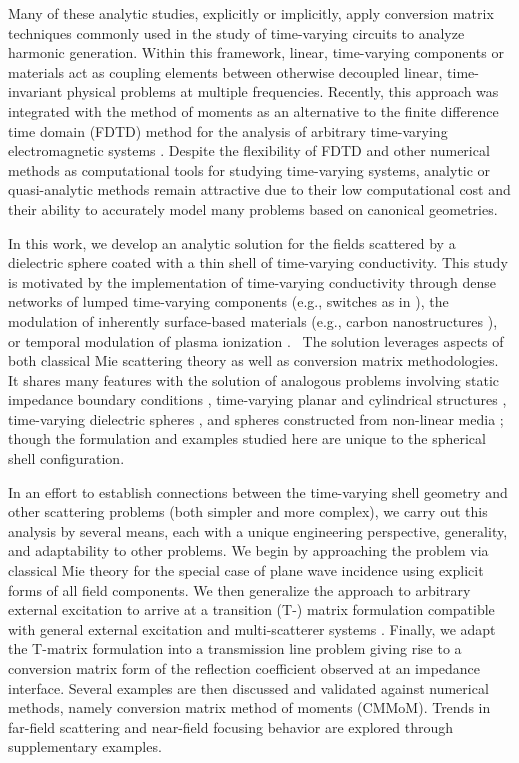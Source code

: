 \documentclass[article]{IEEEtran}
\begin{document}
Many of these analytic studies, explicitly or implicitly, apply conversion matrix techniques \cite{maas2003nonlinear} commonly used in the study of time-varying circuits to analyze harmonic generation. Within this framework, linear, time-varying components or materials act as coupling elements between otherwise decoupled linear, time-invariant physical problems at multiple frequencies.  Recently, this approach was integrated with the method of moments as an alternative to the finite difference time domain (FDTD) method for the analysis of arbitrary time-varying electromagnetic systems \cite{palmer2019investigation,bass2021conversion}.  Despite the flexibility of FDTD and other numerical methods as computational tools for studying time-varying systems, analytic or quasi-analytic methods remain attractive due to their low computational cost and their ability to accurately model many problems based on canonical geometries.

In this work, we develop an analytic solution for the fields scattered by a dielectric sphere coated with a thin shell of time-varying conductivity.  This study is motivated by the implementation of time-varying conductivity through dense networks of lumped time-varying components (e.g., switches as in \cite{wu2019serrodyne,taravati2020space}), the modulation of inherently surface-based materials (e.g., carbon nanostructures \cite{salary2018electrically}),  or temporal modulation of plasma ionization \cite{singletary2021}.~ The solution leverages aspects of both classical Mie scattering theory \cite{jin2011theory} as well as conversion matrix \cite{maas2003nonlinear} methodologies.  It shares many features with the solution of analogous problems involving static impedance boundary conditions \cite{wait1965calculations, sihvola2018resonances}, time-varying planar and cylindrical structures \cite{censor2004non,Wright_2010,salary2018}, time-varying dielectric spheres \cite{stefanou2021light}, and spheres constructed from non-linear media \cite{dewitz1996theory,pavlyukh2004nonlinear}; though the formulation and examples studied here are unique to the spherical shell configuration.  

In an effort to establish connections between the time-varying shell geometry and other scattering problems (both simpler and more complex), we carry out this analysis by several means, each with a unique engineering perspective, generality, and adaptability to other problems.  We begin by approaching the problem via classical Mie theory for the special case of plane wave incidence using explicit forms of all field components.  We then generalize the approach to arbitrary external excitation to arrive at a transition (T-) matrix formulation compatible with general external excitation and multi-scatterer systems \cite{waterman1965matrix}.  Finally, we adapt the T-matrix formulation into a transmission line problem giving rise to a conversion matrix form of the reflection coefficient observed at an impedance interface.  Several examples are then discussed and validated against numerical methods, namely conversion matrix method of moments (CMMoM).  Trends in far-field scattering and near-field focusing behavior are explored through supplementary examples.
\end{document}
